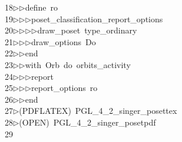 \begin{tabbing}
18\>$\triangleright$\>$\triangleright$\>define\ ro\ \\[0pt]
19\>$\triangleright$\>$\triangleright$\>$\triangleright$\>poset\_classification\_report\_options\ \\[0pt]
20\>$\triangleright$\>$\triangleright$\>$\triangleright$\>$\triangleright$\>draw\_poset\ type\_ordinary\ \\[0pt]
21\>$\triangleright$\>$\triangleright$\>$\triangleright$\>draw\_options\ Do\ \\[0pt]
22\>$\triangleright$\>$\triangleright$\>end\ \\[0pt]
23\>$\triangleright$\>$\triangleright$\>with\ Orb\ do\ orbits\_activity\ \\[0pt]
24\>$\triangleright$\>$\triangleright$\>$\triangleright$\>report\ \ \\[0pt]
25\>$\triangleright$\>$\triangleright$\>$\triangleright$\>report\_options\ ro\ \\[0pt]
26\>$\triangleright$\>$\triangleright$\>end\ \\[0pt]
27\>$\triangleright$\>(PDFLATEX)\ PGL\_4\_2\_singer\_posettex\\[0pt]
28\>$\triangleright$\>(OPEN)\ PGL\_4\_2\_singer\_posetpdf\\[0pt]
29\>\end{tabbing}
